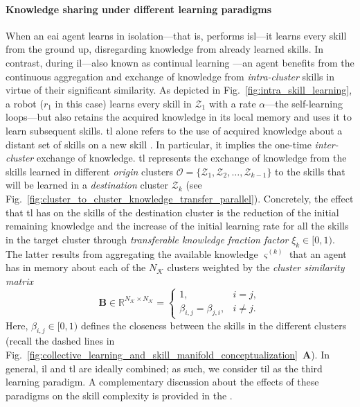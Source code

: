 \documentclass[12pt]{article}
\renewcommand{\emph}[1]{\textit{#1}}
\begin{document}
\paragraph*{Knowledge sharing under different learning paradigms}
When an \ac{eai} agent learns in isolation---that is, performs \ac{isl}---it learns every skill from the ground up, disregarding knowledge from already learned skills. In contrast, during \ac{il}---also known as continual learning \cite{Lesort2020Continuallearningrobotics}---an agent benefits from the continuous aggregation and exchange of knowledge from \emph{intra-cluster} skills in virtue of their significant similarity. As depicted in Fig.~\ref{fig:intra_skill_learning}, a robot ($r_1$ in this case) learns every skill in $\mathcal{Z}_1$ with a rate $\alpha$---the self-learning loops---but also retains the acquired knowledge in its local memory and uses it to learn subsequent skills. \Ac{tl} alone refers to the use of acquired knowledge about a distant set of skills on a new skill \cite{Hosna2022Transferlearningfriendly,Jaquier2023TransferLearningRobotics}. In particular, it implies the one-time \emph{inter-cluster} exchange of knowledge. \Ac{tl} represents the exchange of knowledge from the skills learned in different \emph{origin} clusters $\mathcal{O} = \{ \mathcal{Z}_1,\mathcal{Z}_2,\ldots,\mathcal{Z}_{k-1} \}$ to the skills that will be learned in a \emph{destination} cluster $\mathcal{Z}_k$ (see Fig.~\ref{fig:cluster_to_cluster_knowledge_transfer_parallel}). Concretely, the effect that \ac{tl} has on the skills of the destination cluster is the reduction of the initial remaining knowledge and the increase of the initial learning rate for all the skills in the target cluster through \emph{transferable knowledge fraction factor} $\xi_k \in [0,1)$. The latter results from aggregating the available knowledge $\varsigma^{(k)}$ that an agent has in memory about each of the $N_\mathcal{K}$ clusters weighted by the \emph{cluster similarity matrix}
\begin{equation}\label{eq:cluster_similarity_matrix}
	\bm{B}\in \mathbb{R}^{N_\mathcal{K} \times N_\mathcal{K}}=\begin{cases}
		1, & i=j, \\
		\beta_{i,j} = \beta_{j,i}, & i \neq j.
	\end{cases}
\end{equation}
Here, $\beta_{i,j} \in [0,1)$ defines the closeness between the skills in the different clusters (recall the dashed lines in  Fig.~\ref{fig:collective_learning_and_skill_manifold_conceptualization}~\textbf{A}). In general, \ac{il} and \ac{tl} are ideally combined; as such, we consider \ac{til} as the third learning paradigm. A complementary discussion about the effects of these paradigms on the skill complexity is provided in the .
\end{document}
